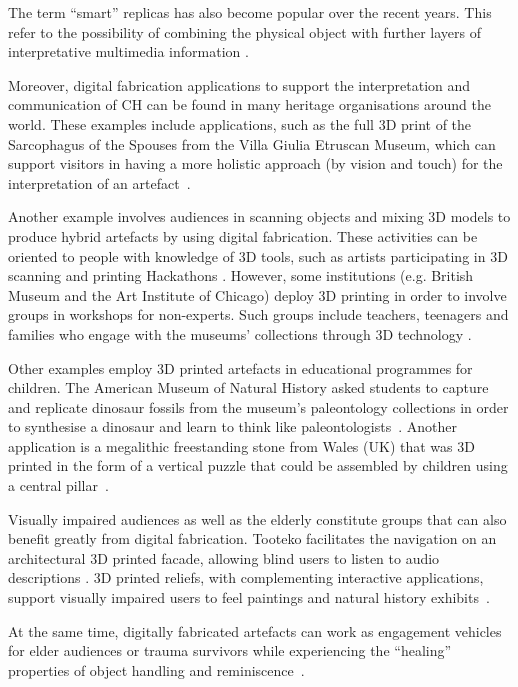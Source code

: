 \documentclass[acmlarge,screen,dvipsnames]{acmart}
\begin{document}
The term ``smart'' replicas has also become popular over the recent
years. This refer to the possibility of combining the physical object
with further layers of interpretative multimedia information
\cite{Capurro2015,Marshall2016}.

Moreover, digital fabrication applications to support the
interpretation and communication of CH can be found in many heritage
organisations around the world. These examples include applications,
such as the full 3D print of the Sarcophagus of the Spouses from the
Villa Giulia Etruscan Museum, which can support visitors in having a
more holistic approach (by vision and touch) for the interpretation of
an artefact~\cite{Guidazzoli2014}.

Another example involves audiences in scanning objects and mixing 3D
models to produce hybrid artefacts by using digital fabrication. These
activities can be oriented to people with knowledge of 3D tools, such
as artists participating in 3D scanning and printing Hackathons
\cite{Mullaney2012,Neely2013}. However, some institutions
(e.g. British Museum and the Art Institute of Chicago) deploy 3D
printing in order to involve groups in workshops for non-experts. Such
groups include teachers, teenagers and families who engage with the
museums' collections through 3D technology
\cite{BritishMuseum2016,Neely2015,Miles2015}.

Other examples employ 3D printed artefacts in educational programmes
for children. The American Museum of Natural History asked students to
capture and replicate dinosaur fossils from the museum's paleontology
collections in order to synthesise a dinosaur and learn to think like
paleontologists~\cite{AMNH2013}. Another application is a megalithic
freestanding stone from Wales (UK) that was 3D printed in the form of
a vertical puzzle that could be assembled by children using a central
pillar~\cite{Miles2015}.

Visually impaired audiences as well as the elderly constitute groups
that can also benefit greatly from digital fabrication. Tooteko
facilitates the navigation on an architectural 3D printed facade,
allowing blind users to listen to audio descriptions
\cite{DAgnano2015}. 3D printed reliefs, with complementing interactive
applications, support visually impaired users to feel paintings and
natural history exhibits~\cite{Reichinger2016a,Samaroudi2017}.

At the same time, digitally fabricated artefacts can work as
engagement vehicles for elder audiences or trauma survivors while
experiencing the ``healing'' properties of object handling and
reminiscence~\cite{PleaseTouch2016}.
\end{document}
